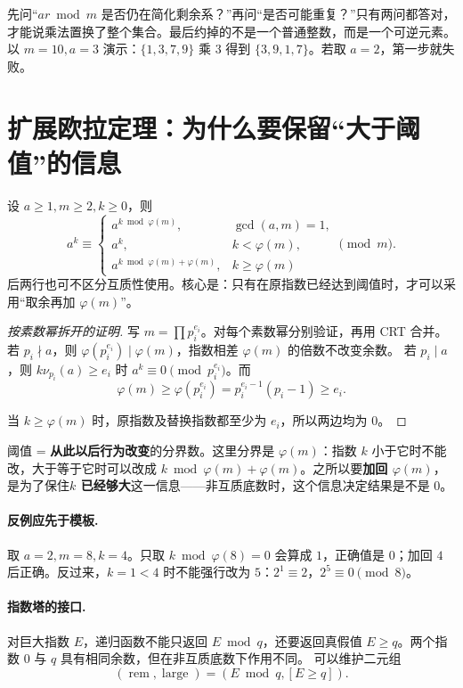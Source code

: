 \documentclass[UTF8,a4paper,11pt,twoside,openright,fontset=fandol]{ctexbook}
\theoremstyle{definition}
\newcommand{\iva}[1]{\left[#1\right]}
\begin{document}
\begin{teach}[证明中的两个关卡]
先问“$ar\bmod m$ 是否仍在简化剩余系？”再问“是否可能重复？”只有两问都答对，才能说乘法置换了整个集合。最后约掉的不是一个普通整数，而是一个可逆元素。
以 $m=10,a=3$ 演示：$\{1,3,7,9\}$ 乘 $3$ 得到 $\{3,9,1,7\}$。若取 $a=2$，第一步就失败。
\end{teach}


\section{扩展欧拉定理：为什么要保留“大于阈值”的信息}
设 $a\ge1,m\ge2,k\ge0$，则
\[
 a^k\equiv
 \begin{cases}
 a^{k\bmod\varphi(m)},&\gcd(a,m)=1,\\
 a^k,&k<\varphi(m),\\
 a^{k\bmod\varphi(m)+\varphi(m)},&k\ge\varphi(m)
 \end{cases}\pmod m.
\]
后两行也可不区分互质性使用。核心是：只有在原指数已经达到阈值时，才可以采用“取余再加 $\varphi(m)$”。


\begin{proof}[按素数幂拆开的证明]
写 $m=\prod p_i^{e_i}$。对每个素数幂分别验证，再用 CRT 合并。
若 $p_i\nmid a$，则 $\varphi(p_i^{e_i})\mid\varphi(m)$，指数相差 $\varphi(m)$ 的倍数不改变余数。
若 $p_i\mid a$，则 $k\nu_{p_i}(a)\ge e_i$ 时 $a^k\equiv0\pmod{p_i^{e_i}}$。而
\[
\varphi(m)\ge\varphi(p_i^{e_i})=p_i^{e_i-1}(p_i-1)\ge e_i.
\]


当 $k\ge\varphi(m)$ 时，原指数及替换指数都至少为 $e_i$，所以两边均为 $0$。
\end{proof}

\begin{tip}[阈值这个词]
阈值 = \textbf{从此以后行为改变}的分界数。这里分界是 $\varphi(m)$：指数 $k$ 小于它时不能改，大于等于它时可以改成 $k\bmod\varphi(m)+\varphi(m)$。之所以要\textbf{加回 $\varphi(m)$}，是为了保住\textbf{$k$ 已经够大}这一信息——非互质底数时，这个信息决定结果是不是 $0$。
\end{tip}


\paragraph{反例应先于模板.} 取 $a=2,m=8,k=4$。只取 $k\bmod\varphi(8)=0$ 会算成 $1$，正确值是 $0$；加回 $4$ 后正确。反过来，$k=1<4$ 时不能强行改为 $5$：$2^1\equiv2$，$2^5\equiv0\pmod8$。

\paragraph{指数塔的接口.} 对巨大指数 $E$，递归函数不能只返回 $E\bmod q$，还要返回真假值 $E\ge q$。两个指数 $0$ 与 $q$ 具有相同余数，但在非互质底数下作用不同。
可以维护二元组
\[
 (\operatorname{rem},\operatorname{large})=(E\bmod q,\iva{E\ge q}).
\]
\end{document}
